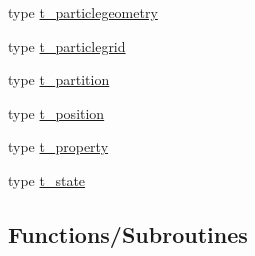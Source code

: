 \begin{DoxyCompactItemize}
\item 
type \mbox{\hyperlink{structmodulelagrangian_1_1t__particlegeometry}{t\+\_\+particlegeometry}}
\item 
type \mbox{\hyperlink{structmodulelagrangian_1_1t__particlegrid}{t\+\_\+particlegrid}}
\item 
type \mbox{\hyperlink{structmodulelagrangian_1_1t__partition}{t\+\_\+partition}}
\item 
type \mbox{\hyperlink{structmodulelagrangian_1_1t__position}{t\+\_\+position}}
\item 
type \mbox{\hyperlink{structmodulelagrangian_1_1t__property}{t\+\_\+property}}
\item 
type \mbox{\hyperlink{structmodulelagrangian_1_1t__state}{t\+\_\+state}}
\end{DoxyCompactItemize}
\subsection*{Functions/\+Subroutines}
